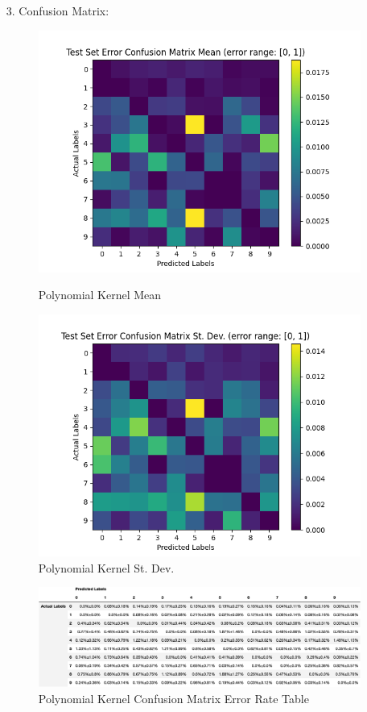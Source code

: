 \documentclass[12pt]{article}
\begin{document}
\begin{itemize}
    \item[3.] Confusion Matrix:

    \begin{figure}[h]
    \centering
    \begin{minipage}{.5\textwidth}
      \centering
      \includegraphics[width=.8\linewidth]{outputs/part1/q3_confusion-imshow_mean.png}
      \caption{Polynomial Kernel Mean}
      \label{fig:3}
    \end{minipage}%
    \begin{minipage}{.5\textwidth}
      \centering
      \includegraphics[width=.8\linewidth]{outputs/part1/q3_confusion-imshow_stdev.png}
      \caption{Polynomial Kernel St. Dev.}
      \label{fig:4}
    \end{minipage}
    \end{figure}

    \begin{figure}[h]
    \centering
    \includegraphics[scale=0.5]{outputs/part1/q3_confusion.png}
    \caption{Polynomial Kernel Confusion Matrix Error Rate Table}
    \label{fig:5}
    \end{figure}



\end{itemize}
\end{document}
